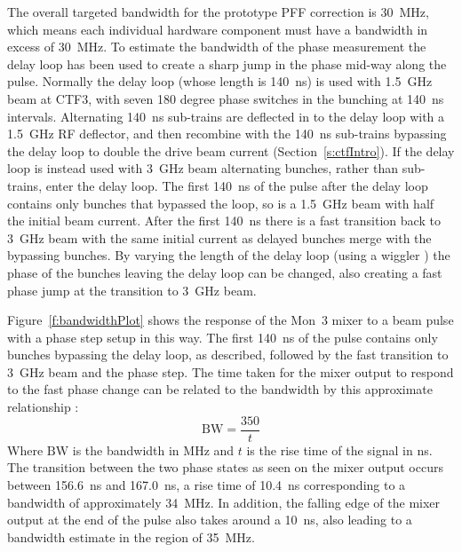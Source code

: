 
The overall targeted bandwidth for the prototype PFF correction is 30~MHz, which means each individual hardware component must have a bandwidth in excess of 30~MHz. To estimate the bandwidth of the phase measurement the delay loop has been used to create a sharp jump in the phase mid-way along the pulse. Normally the delay loop (whose length is 140~ns) is used with 1.5~GHz beam at CTF3, with seven 180 degree phase switches in the bunching at 140~ns intervals. Alternating 140~ns sub-trains are deflected in to the delay loop with a 1.5~GHz RF deflector, and then recombine with the 140~ns sub-trains bypassing the delay loop to double the drive beam current (Section~\ref{s:ctfIntro}). If the delay loop is instead used with 3~GHz beam alternating bunches, rather than sub-trains, enter the delay loop. The first 140~ns of the pulse after the delay loop contains only bunches that bypassed the loop, so is a 1.5~GHz beam with half the initial beam current. After the first 140~ns there is a fast transition back to 3~GHz beam with the same initial current as delayed bunches merge with the bypassing bunches. By varying the length of the delay loop (using a wiggler \cite{wiggler}) the phase of the bunches leaving the delay loop can be changed, also creating a fast phase jump at the transition to 3~GHz beam.

Figure~\ref{f:bandwidthPlot} shows the response of the Mon~3 mixer to a beam pulse with a phase step setup in this way. The first 140~ns of the pulse contains only bunches bypassing the delay loop, as described, followed by the fast transition to 3~GHz beam and the phase step. The time taken for the mixer output to respond to the fast phase change can be related to the bandwidth by this approximate relationship \cite{bwRisTim}:
\begin{equation}
\mathrm{BW} = \frac{350}{t}
\end{equation}
Where \(\mathrm{BW}\) is the bandwidth in MHz and \(t\) is the rise time of the signal in ns. The transition between the two phase states as seen on the mixer output occurs between 156.6~ns and 167.0~ns, a rise time of 10.4~ns corresponding to a bandwidth of approximately 34~MHz. In addition, the falling edge of the mixer output at the end of the pulse also takes around a 10~ns, also leading to a bandwidth estimate in the region of 35~MHz.

